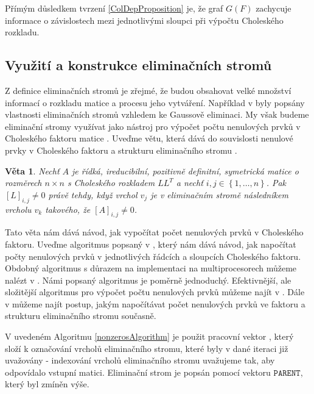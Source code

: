 \documentclass{ctuthesis}
\theoremstyle{plain}
\newtheorem{theorem}{Věta}
\theoremstyle{definition}
\begin{document}
Přímým důsledkem tvrzení \ref{ColDepProposition} je, že graf $G(F)$ zachycuje informace o závislostech mezi jednotlivými sloupci při výpočtu Choleského rozkladu. 

\subsection{Využití a konstrukce eliminačních stromů}
\label{EltreeAlgSection}

Z definice eliminačních stromů je zřejmé, že budou obsahovat velké množství informací o rozkladu matice a procesu jeho vytváření. Například v \cite{schr:82} byly popsány vlastnosti eliminačních stromů vzhledem ke Gaussově eliminaci. My však budeme eliminační stromy využívat jako nástroj pro výpočet počtu nenulových prvků v Choleského faktoru matice \cite{liu:90}. Uveďme větu, která dává do souvislosti nenulové prvky v Choleského faktoru a strukturu eliminačního stromu \cite{liu:86}.

\begin{theorem}
  Nechť $A$ je řídká, ireducibilní, pozitivně definitní, symetrická matice o rozměrech $n \times n$ s Choleského rozkladem $LL^T$ a nechť $i,j \in \left\{1,\ldots,n \right\}$. Pak $[L]_{i,j} \neq 0$ právě tehdy, když vrchol $v_j$ je v eliminačním stromě následníkem vrcholu $v_k$ takového, že $[A]_{i,j} \neq 0$.
\end{theorem}

Tato věta nám dává návod, jak vypočítat počet nenulových prvků v Choleského faktoru. Uveďme algoritmus popsaný v \cite{liu:90}, který nám dává návod, jak napočítat počty nenulových prvků v jednotlivých řádcích a sloupcích Choleského faktoru. Obdobný algoritmus s důrazem na implementaci na multiprocesorech můžeme nalézt v \cite{zmgi:88}. Námi popsaný algoritmus je poměrně jednoduchý. Efektivnější, ale složitější algoritmus pro výpočet počtu nenulových prvků můžeme najít v \cite{gil:94}. Dále v \cite{basm:87} můžeme najít postup, jakým napočítávat počet nenulových prvků ve faktoru a strukturu eliminačního stromu současně.

V uvedeném Algoritmu \ref{nonzerosAlgorithm} je použit pracovní vektor \Marker, který složí k označování vrcholů eliminačního stromu, které byly v dané iteraci již uvažovány - indexování vrcholů eliminačního stromu uvažujeme tak, aby odpovídalo vstupní matici. Eliminační strom je popsán pomocí vektoru $\texttt{PARENT}$, který byl zmíněn výše.
\end{document}
